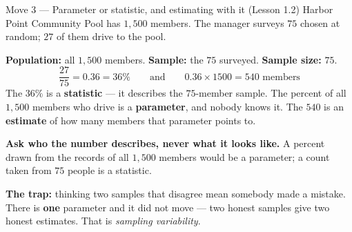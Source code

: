\documentclass[10pt]{article}
\begin{document}
\vspace{3pt}
\boxguard[14]
\begin{notesbox}{Move 3 --- Parameter or statistic, and estimating with it (Lesson 1.2)}
\small
Harbor Point Community Pool has $1{,}500$ members. The manager surveys $75$ chosen at random;
$27$ of them drive to the pool.

\vspace{2pt}
\textbf{Population:} all $1{,}500$ members. \quad \textbf{Sample:} the $75$ surveyed. \quad
\textbf{Sample size:} $75$.
\[ \frac{27}{75} = 0.36 = 36\% \qquad\text{and}\qquad 0.36 \times 1500 = 540 \text{ members} \]
The $36\%$ is a \textbf{statistic} --- it describes the $75$-member sample. The percent of all
$1{,}500$ members who drive is a \textbf{parameter}, and nobody knows it. The $540$ is an
\textbf{estimate} of how many members that parameter points to.

\vspace{2pt}
\textbf{Ask who the number describes, never what it looks like.} A percent drawn from the
records of all $1{,}500$ members would be a parameter; a count taken from $75$ people is a
statistic.

\vspace{2pt}
\textbf{The trap:} thinking two samples that disagree mean somebody made a mistake. There is
\textbf{one} parameter and it did not move --- two honest samples give two honest estimates.
That is \emph{sampling variability}.
\end{notesbox}
\end{document}
